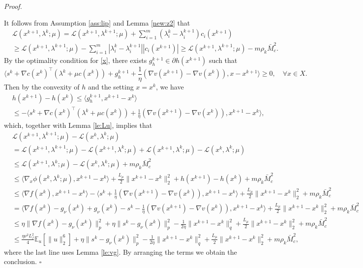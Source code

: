\documentclass[11pt]{article}
\newenvironment{proof}[1][Proof]{%
    \par\noindent\textit{#1.}\enspace
  }{%
    \hfill\ensuremath{\square}\par
  }%
\numberwithin{equation}{section}
\newcommand{\E}{\mathbb{E}}
\newcommand{\bee}{\begin{equation*}}
\newcommand{\eee}{\end{equation*}}
\begin{document}
\begin{proof}
    It follows from Assumption \ref{ass:lip} and Lemma \ref{new:z2} that
    \bee
    \begin{aligned}
        &\mathcal{L} ( x^{k+1},\lambda^{k};\mu )  = \mathcal{L} ( x^{k+1},\lambda^{k+1} ;\mu) +\sum_{i=1}^m   (\lambda_i^k -  \lambda_i^{k+1}  )  c_i ( x^{k+1} )    \\
        &\geq  \mathcal{L} ( x^{k+1},\lambda^{k+1} ;\mu) -\sum_{i=1}^m   | \lambda_i^{k}-\lambda_i^{k+1}   | | c_i ( x^{k+1} )   |
         \ge \mathcal{L} ( x^{k+1},\lambda^{k+1};\mu ) -m \rho_k \bar{M}_c^2.
    \end{aligned}
    \eee
    By the optimality condition for \eqref{x}, there exists  $g_h^{k+1} \in \partial h(x^{k+1})$ such that
    \bee
         \langle s^k+\nabla c(x^k)^\top (\lambda^k+\mu c(x^k))+g_h^{k+1}+\frac{1}{\eta}(\nabla v(x^{k+1})-\nabla v(x^k)),x-x^{k+1} \rangle \geq 0,\quad \forall x \in X.
    \eee
    Then by  the convexity of $h $ and the setting $x=x^k $, we have
    \bee
    \begin{aligned}
        &h(x^{k+1})-h(x^k) \leq \langle g_h^{k+1}, x^{k+1}-x^k \rangle \\
        &\leq - \langle s^k+\nabla c(x^k)^\top (\lambda^k+\mu c(x^k))+\frac{1}{\eta}(\nabla v(x^{k+1})-\nabla v(x^k)),x^{k+1}-x^k \rangle,
    \end{aligned}
    \eee
     which, together with Lemma \ref{le:Lu}, implies that
    \begin{align*}
        &\mathcal{L}(x^{k+1},\lambda^{k+1};\mu)-\mathcal{L}(x^k,\lambda^k;\mu)\\
        & = \mathcal{L}(x^{k+1},\lambda^{k+1};\mu) -\mathcal{L}(x^{k+1},\lambda^k;\mu)+\mathcal{L}(x^{k+1},\lambda^k;\mu)-\mathcal{L}(x^k,\lambda^k;\mu)\\
        & \leq \mathcal{L}(x^{k+1},\lambda^k;\mu) -\mathcal{L}(x^k,\lambda^k;\mu)+m\rho_k \bar{M}_c^2\\
        & \leq  \langle \nabla_x \phi(x^k,\lambda^k;\mu),x^{k+1}-x^k\rangle + \frac{L_\mu}{2}\|x^{k+1}-x^k\|_2^2+h(x^{k+1})-h(x^k)+m\rho_k \bar{M}_c^2\\
        & \leq \langle \nabla f (x^k),x^{k+1}-x^k\rangle - \langle s^k+\frac{1}{\eta}(\nabla v(x^{k+1})-\nabla v(x^k)),x^{k+1}-x^k\rangle + \frac{L_\mu}{2}\|x^{k+1}-x^k\|_2^2+m\rho_k \bar{M}_c^2\\
        &= \langle \nabla f(x^k)-g_\nu(x^k)+g_\nu (x^k) - s^k - \frac{1}{\eta}(\nabla v(x^{k+1})-\nabla v(x^k)),x^{k+1}-x^k\rangle  + \frac{L_\mu}{2}\|x^{k+1}-x^k\|_2^2+m\rho_k \bar{M}_c^2\\
        & \leq \eta \|\nabla f(x^k)-g_\nu(x^k)\|_p^2 + \eta \|s^k - g_\nu (x^k)\|_p^2-\frac{1}{2\eta} \|x^{k+1}-x^k\|_q^2 + \frac{L_\mu}{2}\|x^{k+1}-x^k\|_2^2 +m\rho_k \bar{M}_c^2\\
        & \leq \frac{\eta \nu^2 L_f^2}{4}\E_u[\|u\|_2^6] + \eta \|s^k - g_\nu (x^k)\|_p^2 -\frac{1}{2\eta} \|x^{k+1}-x^k\|_q^2 + \frac{L_\mu}{2}\|x^{k+1}-x^k\|_2^2+m\rho_k \bar{M}_c^2,
    \end{align*}
    where the last line uses Lemma \ref{le:vg}. By arranging the terms we obtain the conclusion. 
\end{proof}
\end{document}
